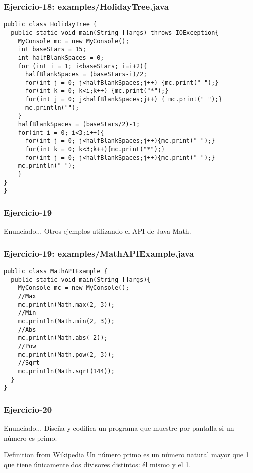 \documentclass[xcolor=dvipsnames,dvip,notes=show,handout,table]{beamer}
\begin{document}
\begin{frame}[fragile]
\frametitle{Ejercicio-18: examples/HolidayTree.java}
\tiny
\begin{lstlisting}
public class HolidayTree {
  public static void main(String []args) throws IOException{
    MyConsole mc = new MyConsole();
    int baseStars = 15;
    int halfBlankSpaces = 0;
    for (int i = 1; i<baseStars; i=i+2){
      halfBlankSpaces = (baseStars-i)/2;
      for(int j = 0; j<halfBlankSpaces;j++) {mc.print(" ");}
      for(int k = 0; k<i;k++) {mc.print("*");}
      for(int j = 0; j<halfBlankSpaces;j++) { mc.print(" ");}
      mc.println("");
    }
    halfBlankSpaces = (baseStars/2)-1;
    for(int i = 0; i<3;i++){
      for(int j = 0; j<halfBlankSpaces;j++){mc.print(" ");}
      for(int k = 0; k<3;k++){mc.print("*");}
      for(int j = 0; j<halfBlankSpaces;j++){mc.print(" ");}
    mc.println(" ");
    }
}
}
\end{lstlisting}
\end{frame}


\begin{frame}[fragile]
\frametitle{Ejercicio-19}
\begin{block}{Enunciado...}
  Otros ejemplos utilizando el API de Java Math.
\end{block}

\end{frame}


\begin{frame}[fragile]
\frametitle{Ejercicio-19: examples/MathAPIExample.java}
\tiny
\begin{lstlisting}
public class MathAPIExample {
  public static void main(String []args){
    MyConsole mc = new MyConsole();
    //Max
    mc.println(Math.max(2, 3));
    //Min
    mc.println(Math.min(2, 3));
    //Abs		
    mc.println(Math.abs(-2));
    //Pow
    mc.println(Math.pow(2, 3));
    //Sqrt
    mc.println(Math.sqrt(144));
  }
}
\end{lstlisting}
\end{frame}



\begin{frame}[fragile]
\frametitle{Ejercicio-20}
\begin{block}{Enunciado...}
Diseña y codifica un programa que muestre por pantalla si un número es primo.
\end{block}

\begin{exampleblock}{Definition from Wikipedia}
Un número primo es un número natural mayor que 1 que tiene únicamente dos divisores distintos: él mismo y el 1.
\end{exampleblock}

\end{frame}
\end{document}
